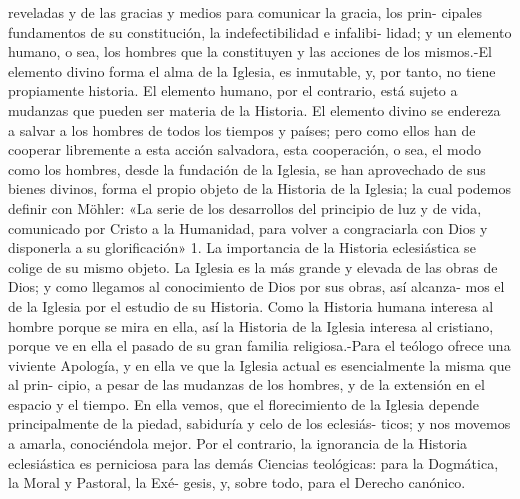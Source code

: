 \raggedbottom{} \documentclass[12pt]{book}
\begin{document}
reveladas y de las gracias y medios para comunicar la gracia, los prin-
cipales fundamentos de su constitución, la indefectibilidad e infalibi-
lidad; y un elemento humano, o sea, los hombres que la constituyen
y las acciones de los mismos.-El elemento divino forma el alma de
la Iglesia, es inmutable, y, por tanto, no tiene propiamente historia.
El elemento humano, por el contrario, está sujeto a mudanzas que
pueden ser materia de la Historia. El elemento divino se endereza a
salvar a los hombres de todos los tiempos y países; pero como ellos
han de cooperar libremente a esta acción salvadora, esta cooperación,
o sea, el modo como los hombres, desde la fundación de la Iglesia, se
han aprovechado de sus bienes divinos, forma el propio objeto de la
Historia de la Iglesia; la cual podemos definir con Möhler: «La serie
de los desarrollos del principio de luz y de vida, comunicado por Cristo
a la Humanidad, para volver a congraciarla con Dios y disponerla a su
glorificación» 1.
La importancia de la Historia eclesiástica se colige de su mismo
objeto. La Iglesia es la más grande y elevada de las obras de Dios;
y como llegamos al conocimiento de Dios por sus obras, así alcanza-
mos el de la Iglesia por el estudio de su Historia. Como la Historia
humana interesa al hombre porque se mira en ella, así la Historia de
la Iglesia interesa al cristiano, porque ve en ella el pasado de su gran
familia religiosa.-Para el teólogo ofrece una viviente Apología, y en
ella ve que la Iglesia actual es esencialmente la misma que al prin-
cipio, a pesar de las mudanzas de los hombres, y de la extensión en el
espacio y el tiempo. En ella vemos, que el florecimiento de la Iglesia
depende principalmente de la piedad, sabiduría y celo de los eclesiás-
ticos; y nos movemos a amarla, conociéndola mejor. Por el contrario,
la ignorancia de la Historia eclesiástica es perniciosa para las demás
Ciencias teológicas: para la Dogmática, la Moral y Pastoral, la Exé-
gesis, y, sobre todo, para el Derecho canónico.
\end{document}
